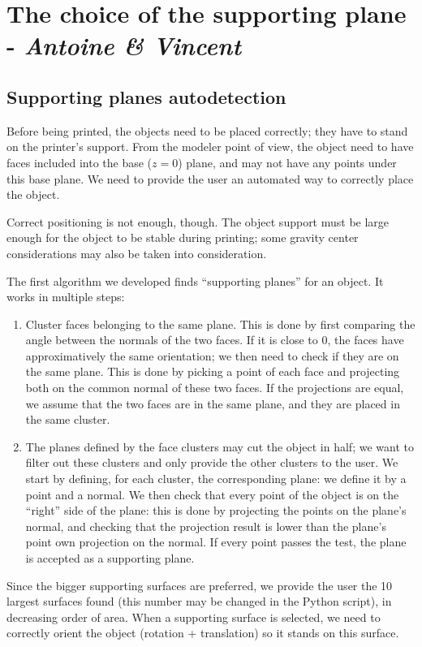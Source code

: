 \documentclass{report}
\begin{document}
\section{The choice of the supporting plane - \textit{Antoine \& Vincent}}

\subsection{Supporting planes autodetection}
Before being printed, the objects need to be placed correctly; they have to stand on the printer’s support. From the modeler point of view, the object need to have faces included into the base ($z = 0$) plane, and may not have any points under this base plane. We need to provide the user an automated way to correctly place the object.

Correct positioning is not enough, though. The object support must be large enough for the object to be stable during printing; some gravity center considerations may also be taken into consideration.

The first algorithm we developed finds “supporting planes” for an object. It works in multiple steps:
\begin{enumerate}
\item Cluster faces belonging to the same plane. This is done by first comparing the angle between the normals of the two faces. If it is close to $0$, the faces have approximatively the same orientation; we then need to check if they are on the same plane. This is done by picking a point of each face and projecting both on the common normal of these two faces. If the projections are equal, we assume that the two faces are in the same plane, and they are placed in the same cluster.
\item The planes defined by the face clusters may cut the object in half; we want to filter out these clusters and only provide the other clusters to the user. We start by defining, for each cluster, the corresponding plane: we define it by a point and a normal. We then check that every point of the object is on the “right” side of the plane: this is done by projecting the points on the plane’s normal, and checking that the projection result is lower than the plane’s point own projection on the normal. If every point passes the test, the plane is accepted as a supporting plane.
\end{enumerate}

Since the bigger supporting surfaces are preferred, we provide the user the 10 largest surfaces found (this number may be changed in the Python script), in decreasing order of area. When a supporting surface is selected, we need to correctly orient the object (rotation + translation) so it stands on this surface.
\end{document}
